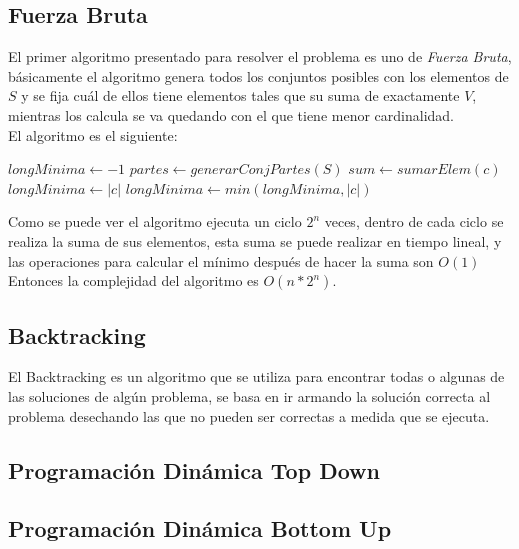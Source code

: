 \documentclass[a4paper]{article}
\begin{document}
\subsection{Fuerza Bruta}
El primer algoritmo presentado para resolver el problema es uno de \textit{Fuerza Bruta}, b\'asicamente el algoritmo genera todos los conjuntos posibles con los elementos de $S$ y se fija cu\'al de ellos tiene elementos tales que su suma de exactamente $V$, mientras los calcula se va quedando con el que tiene menor cardinalidad.
\\
El algoritmo es el siguiente:
\\
\begin{algorithm}
\begin{algorithmic}
		\State $longMinima \gets -1$
		\State $partes \gets generarConjPartes(S)$
			\State $sum \gets sumarElem(c)$
					\State $longMinima \gets |c|$
				\Else
					\State $longMinima \gets min(longMinima, |c|)$
				\EndIf
			\EndIf
		\EndFor
		
	\EndProcedure
\end{algorithmic}
\end{algorithm}

Como se puede ver el algoritmo ejecuta un ciclo $2^n$ veces, dentro de cada ciclo se realiza la suma de sus elementos, esta suma se puede realizar en tiempo lineal, y las operaciones para calcular el m\'inimo despu\'es de hacer la suma son $O(1)$
Entonces la complejidad del algoritmo es $O(n * 2^n)$.

\subsection{Backtracking}
El Backtracking es un algoritmo que se utiliza para encontrar todas o algunas de las soluciones de alg\'un problema, se basa en ir armando la soluci\'on correcta al problema desechando las que no pueden ser correctas a medida que se ejecuta.
\subsection{Programaci\'on Din\'amica Top Down}
\subsection{Programaci\'on Din\'amica Bottom Up}
\end{document}
